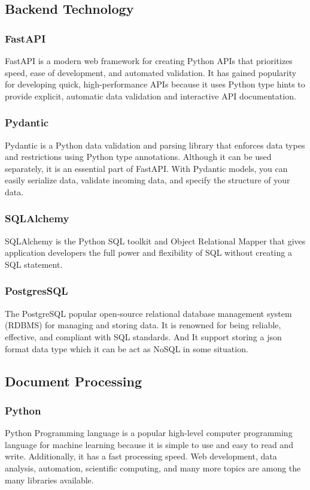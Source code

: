 \documentclass[12pt,oneside,openright,a4paper]{cpe-english-project}
\begin{document}
\subsection{Backend Technology}
\subsubsection{FastAPI} FastAPI is a modern web framework for creating Python APIs that prioritizes speed, ease of development, and automated validation. It has gained popularity for developing quick, high-performance APIs because it uses Python type hints to provide explicit, automatic data validation and interactive API documentation.

\subsubsection{Pydantic} Pydantic is a Python data validation and parsing library that enforces data types and restrictions using Python type annotations. Although it can be used separately, it is an essential part of FastAPI. With Pydantic models, you can easily serialize data, validate incoming data, and specify the structure of your data.

\subsubsection{SQLAlchemy} SQLAlchemy is the Python SQL toolkit and Object Relational Mapper that gives application developers the full power and flexibility of SQL without creating a SQL statement.

\subsubsection{PostgresSQL} The PostgreSQL popular open-source relational database management system (RDBMS) for managing and storing data. It is renowned for being reliable, effective, and compliant with SQL standards. And It support storing a json format data type which it can be act as NoSQL in some situation.

\subsection{Document Processing}
\subsubsection{Python} Python Programming language is a popular high-level computer programming language for machine learning because it is simple to use and easy to read and write. Additionally, it has a fast processing speed. Web development, data analysis, automation, scientific computing, and many more topics are among the many libraries available.
\newpage %
\end{document}

